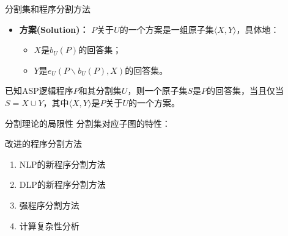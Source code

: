 \documentclass{beamer}
\begin{document}
\begin{frame}[t]{分割集和程序分割方法}
	\begin{itemize}
		\item {\textbf{方案(Solution)：} $P$关于$U$的一个方案是一组原子集$\langle X,Y \rangle$，具体地：
			\begin{itemize}
				\item $X$是$b_U(P)$的回答集；
				\item $Y$是$e_U(P \backslash b_U(P), X)$的回答集。
			\end{itemize}
			}
	\end{itemize}
	
	
	\begin{theorem}[分割集理论]
		已知ASP逻辑程序$P$和其分割集$U$，则一个原子集$S$是$P$的回答集，当且仅当$S = X \cup Y$，其中$\langle X,Y \rangle$是$P$关于$U$的一个方案。
	\end{theorem}
	
\end{frame}


\begin{frame}[t]{分割理论的局限性}
	分割集对应子图的特性：
\end{frame}





\begin{frame}[t]{改进的程序分割方法}
	\begin{enumerate}
		\item NLP的新程序分割方法
		\item DLP的新程序分割方法
		\item 强程序分割方法
		\item 计算复杂性分析
	\end{enumerate}
\end{frame}
\end{document}

